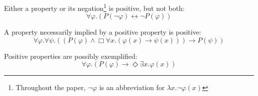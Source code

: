 \documentclass[smallextended]{svjour3}
\newcommand{\imp}{\rightarrow}
\newcommand{\biimp}{\leftrightarrow}
\newcommand{\all}{\forall}
\newcommand{\ex}{\exists}
\newcommand{\nec}{\Box} %
\newcommand{\pos}{\Diamond} %
\begin{document}
\begin{axiom}
\label{A1}
Either a property or its negation\footnote{Throughout the paper, $\neg \varphi$ is an abbreviation for $\lambda x. \neg \varphi(x)$} is positive, but not both:
$$
\all \varphi. (P(\neg \varphi) \biimp \neg P(\varphi))
$$
\end{axiom}

\begin{axiom}
\label{A2}
A property necessarily implied by a positive property is positive:
$$
\all \varphi. \all \psi.((P(\varphi) \wedge \nec \all x.(\varphi(x) \imp \psi(x))) \imp P(\psi))
$$
\end{axiom}


\begin{theorem}
\label{T1}
Positive properties are possibly exemplified:
$$
\all \varphi. (P(\varphi) \imp \pos \ex x.\varphi(x))
$$
\end{theorem}
\end{document}
